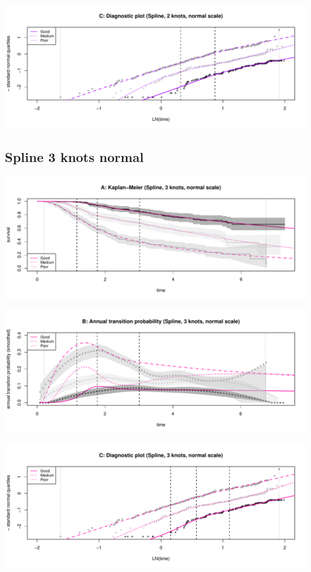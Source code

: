 \documentclass[]{article}
\begin{document}
\begin{flushleft}\includegraphics[height=0.25\textheight]{Images/spline_norm2-3} \end{flushleft}

\newpage 

\subsection{Spline 3 knots normal}\label{spline-3-knots-normal}

\begin{flushleft}\includegraphics[height=0.25\textheight]{Images/spline_norm3-1} \end{flushleft}

\begin{flushleft}\includegraphics[height=0.25\textheight]{Images/spline_norm3-2} \end{flushleft}

\begin{flushleft}\includegraphics[height=0.25\textheight]{Images/spline_norm3-3} \end{flushleft}
\end{document}
